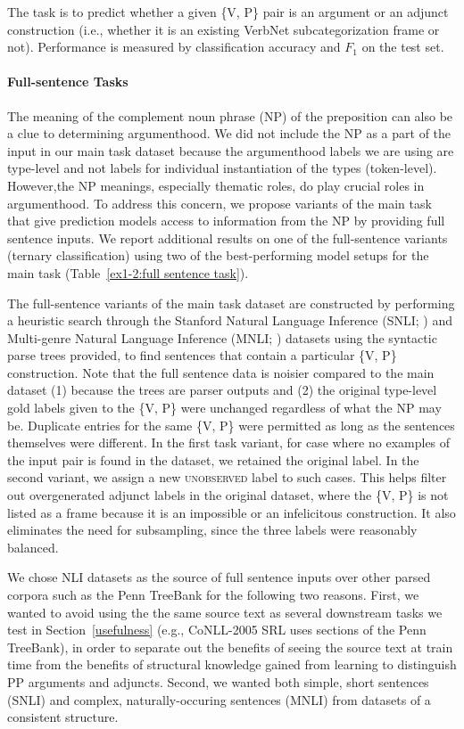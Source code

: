 \documentclass[letterpaper]{article} %
\begin{document}
The task is to predict whether a given \textsc{\{V, P\}} pair is an argument or an adjunct construction (i.e., whether it is an existing VerbNet subcategorization frame or not). Performance is measured by classification accuracy and $F_1$ on the test set.

\paragraph{Full-sentence Tasks} The meaning of the complement noun phrase (NP) of the preposition can also be a clue to determining argumenthood. We did not include the NP as a part of the input in our main task dataset because the argumenthood labels we are using are type-level and not labels for individual instantiation of the types (token-level). However,the NP meanings, especially thematic roles, do play crucial roles in argumenthood. To address this concern, we propose variants of the main task that give prediction models access to information from the NP by providing full sentence inputs. We report additional results on one of the full-sentence variants (ternary classification) using two of the best-performing model setups for the main task (Table~\ref{ex1-2:full sentence task}).

The full-sentence variants of the main task dataset are constructed by performing a heuristic search through the Stanford Natural Language Inference (SNLI; \cite{bowman2015large}) and Multi-genre Natural Language Inference (MNLI; \cite{williams2018broad}) datasets using the syntactic parse trees provided, to find sentences that contain a particular \{\textsc{V, P}\} construction. Note that the full sentence data is noisier compared to the main dataset (1) because the trees are parser outputs and (2) the original type-level gold labels given to the \{\textsc{V, P}\} were unchanged regardless of what the NP may be. Duplicate entries for the same \{\textsc{V, P}\} were permitted as long as the sentences themselves were different. In the first task variant, for case where no examples of the input pair is found in the dataset, we retained the original label. In the second variant, we assign a new \textsc{unobserved} label to such cases. This helps filter out overgenerated adjunct labels in the original dataset, where the \{\textsc{V, P}\} is not listed as a frame because it is an impossible or an infelicitous construction. It also eliminates the need for subsampling, since the three labels were reasonably balanced.

We chose NLI datasets as the source of full sentence inputs over other parsed corpora such as the Penn TreeBank for the following two reasons. First, we wanted to avoid using the the same source text as several downstream tasks we test in Section~\ref{usefulness} (e.g., CoNLL-2005 SRL \cite{carreras2005introduction} uses sections of the Penn TreeBank), in order to separate out the benefits of seeing the source text at train time from the benefits of structural knowledge gained from learning to distinguish PP arguments and adjuncts. Second, we wanted both simple, short sentences (SNLI) and complex, naturally-occuring sentences (MNLI) from datasets of a consistent structure.
\end{document}
